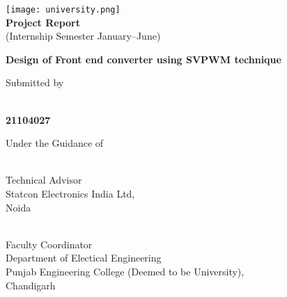 \begin{titlepage}
    \begin{center}
        \texttt{[image: university.png]}\\
        {\textbf{Project Report}}\\
        \vspace*{0.2cm}
        (Internship Semester January--June)

        \vspace*{3cm}
        {\Large\textbf {Design of Front end converter using SVPWM technique}}

        \vfill
        Submitted by

        \vfill
        \textbf{
        \name \\
        21104027
        }

        \vfill
        Under the Guidance of
    \end{center}
    \vfill

    \noindent
    
    \begin{minipage}[t]{0.5\textwidth}
        \raggedright
        \industry \\
        Technical Advisor\\
        Statcon Electronics India Ltd,\\
        Noida
    \end{minipage}
    \hfill
    \begin{minipage}[t]{0.5\textwidth}
        \raggedleft
        \faculty \\
        Faculty Coordinator\\
        Department of Electical Engineering\\
        Punjab Engineering College (Deemed to be University),\\
        Chandigarh
    \end{minipage}
\end{titlepage}